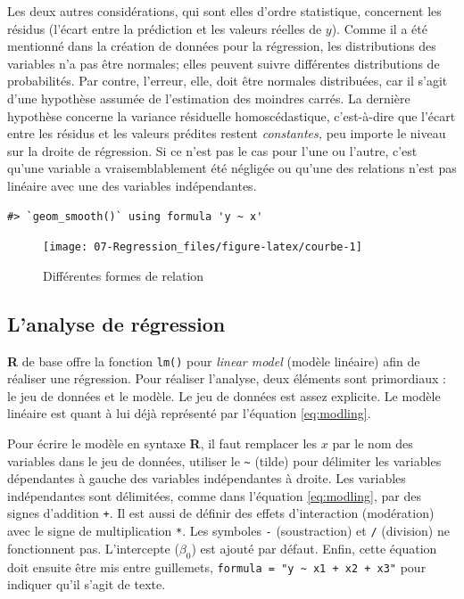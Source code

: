 \documentclass[
]{book}
\begin{document}
Les deux autres considérations, qui sont elles d'ordre statistique, concernent les résidus (l'écart entre la prédiction et les valeurs réelles de \(y\)). Comme il a été mentionné dans la création de données pour la régression, les distributions des variables n'a pas être normales; elles peuvent suivre différentes distributions de probabilités. Par contre, l'erreur, elle, doit être normales distribuées, car il s'agit d'une hypothèse assumée de l'estimation des moindres carrés. La dernière hypothèse concerne la variance résiduelle homoscédastique, c'est-à-dire que l'écart entre les résidus et les valeurs prédites restent \emph{constantes,} peu importe le niveau sur la droite de régression. Si ce n'est pas le cas pour l'une ou l'autre, c'est qu'une variable a vraisemblablement été négligée ou qu'une des relations n'est pas linéaire avec une des variables indépendantes.

\begin{verbatim}
#> `geom_smooth()` using formula 'y ~ x'
\end{verbatim}

\begin{figure}

{\centering \texttt{[image: 07-Regression\_files/figure-latex/courbe-1]} 

}

\caption{Différentes formes de relation}\label{fig:courbe}
\end{figure}

\hypertarget{lanalyse-de-ruxe9gression-1}{%
\subsection{L'analyse de régression}\label{lanalyse-de-ruxe9gression-1}}

\textbf{R} de base offre la fonction \texttt{lm()} pour \emph{linear model} (modèle linéaire) afin de réaliser une régression. Pour réaliser l'analyse, deux éléments sont primordiaux : le jeu de données et le modèle. Le jeu de données est assez explicite. Le modèle linéaire est quant à lui déjà représenté par l'équation \eqref{eq:modling}.

Pour écrire le modèle en syntaxe \textbf{R}, il faut remplacer les \(x\) par le nom des variables dans le jeu de données, utiliser le \texttt{\textasciitilde{}} (tilde) pour délimiter les variables dépendantes à gauche des variables indépendantes à droite. Les variables indépendantes sont délimitées, comme dans l'équation \eqref{eq:modling}, par des signes d'addition \texttt{+}. Il est aussi de définir des effets d'interaction (modération) avec le signe de multiplication \texttt{*}. Les symboles \texttt{-} (soustraction) et \texttt{/} (division) ne fonctionnent pas. L'intercepte (\(\beta_0\)) est ajouté par défaut. Enfin, cette équation doit ensuite être mis entre guillemets, \texttt{formula\ =\ "y\ \textasciitilde{}\ x1\ +\ x2\ +\ x3"} pour indiquer qu'il s'agit de texte.
\end{document}

